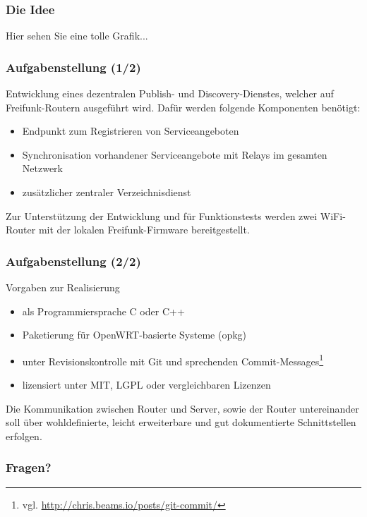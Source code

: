 \documentclass[accentcolor=tud6b,colorbacktitle,inverttitle,landscape,german,presentation,t]{tudbeamer}
\begin{document}
	\begin{frame}
		\frametitle{Die Idee}
		\vfill
		Hier sehen Sie eine tolle Grafik...
		\vfill
	\end{frame}
	
	\begin{frame}
		\frametitle{Aufgabenstellung (1/2)}
			Entwicklung eines dezentralen Publish- und Discovery-Dienstes, welcher auf Freifunk-Routern ausgeführt wird.
			\vfill
			\pause
			Dafür werden folgende Komponenten benötigt:
			\begin{itemize}
			\item Endpunkt zum Registrieren von Serviceangeboten
			\item Synchronisation vorhandener Serviceangebote mit Relays im gesamten Netzwerk
			\item zusätzlicher zentraler Verzeichnisdienst
			\end{itemize}
			\vfill
			\pause
			Zur Unterstützung der Entwicklung und für Funktionstests werden zwei WiFi-Router mit der lokalen Freifunk-Firmware bereitgestellt.
	\end{frame}
	
	\begin{frame}
		\frametitle{Aufgabenstellung (2/2)}
		\vfill
		Vorgaben zur Realisierung
		\begin{itemize}
			\item als Programmiersprache C oder C++
			\item Paketierung für OpenWRT-basierte Systeme (opkg)
			\item unter Revisionskontrolle mit Git und sprechenden Commit-Messages\footnote{vgl. \url{http://chris.beams.io/posts/git-commit/}}
			\item lizensiert unter MIT, LGPL oder vergleichbaren Lizenzen
		\end{itemize}
		\vfill
		\pause
		Die Kommunikation zwischen Router und Server, sowie der Router untereinander soll über wohldefinierte, leicht erweiterbare und gut dokumentierte Schnittstellen erfolgen.
		\vfill
	\end{frame}
	
	\begin{frame}
		\frametitle{Fragen?}
		    \vfill
	\end{frame}
\end{document}
